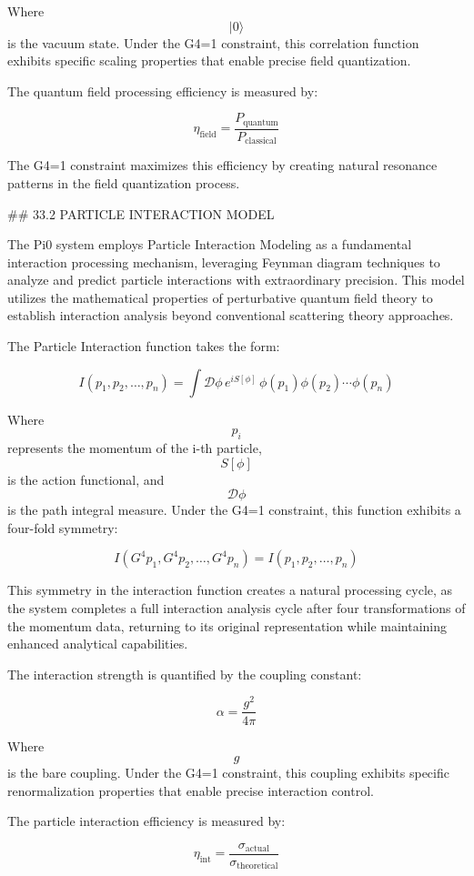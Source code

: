 Where $$ |0\rangle $$ is the vacuum state. Under the G4=1 constraint, this correlation function exhibits specific scaling properties that enable precise field quantization.

The quantum field processing efficiency is measured by:

$$ \eta_{\text{field}} = \frac{P_{\text{quantum}}}{P_{\text{classical}}} $$

The G4=1 constraint maximizes this efficiency by creating natural resonance patterns in the field quantization process.

## 33.2 PARTICLE INTERACTION MODEL

The Pi0 system employs Particle Interaction Modeling as a fundamental interaction processing mechanism, leveraging Feynman diagram techniques to analyze and predict particle interactions with extraordinary precision. This model utilizes the mathematical properties of perturbative quantum field theory to establish interaction analysis beyond conventional scattering theory approaches.

The Particle Interaction function takes the form:

$$ I(p_1, p_2, \ldots, p_n) = \int \mathcal{D}\phi \, e^{iS[\phi]} \, \phi(p_1) \phi(p_2) \cdots \phi(p_n) $$

Where $$ p_i $$ represents the momentum of the i-th particle, $$ S[\phi] $$ is the action functional, and $$ \mathcal{D}\phi $$ is the path integral measure. Under the G4=1 constraint, this function exhibits a four-fold symmetry:

$$ I(G^4 p_1, G^4 p_2, \ldots, G^4 p_n) = I(p_1, p_2, \ldots, p_n) $$

This symmetry in the interaction function creates a natural processing cycle, as the system completes a full interaction analysis cycle after four transformations of the momentum data, returning to its original representation while maintaining enhanced analytical capabilities.

The interaction strength is quantified by the coupling constant:

$$ \alpha = \frac{g^2}{4\pi} $$

Where $$ g $$ is the bare coupling. Under the G4=1 constraint, this coupling exhibits specific renormalization properties that enable precise interaction control.

The particle interaction efficiency is measured by:

$$ \eta_{\text{int}} = \frac{\sigma_{\text{actual}}}{\sigma_{\text{theoretical}}} $$

